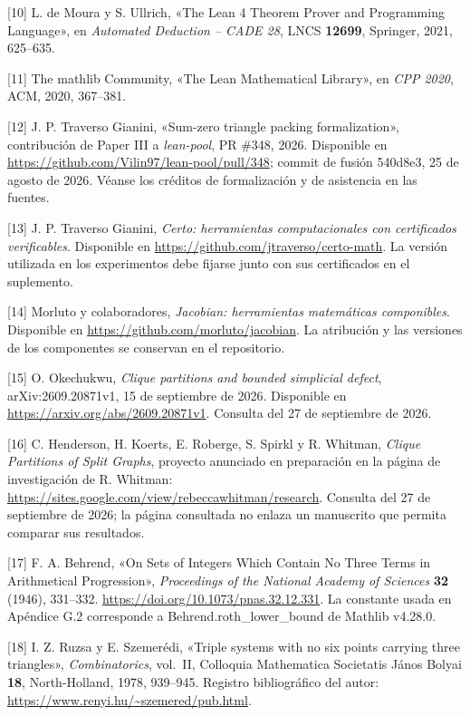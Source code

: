 \documentclass[spanish,11pt,a4paper]{article}
\begin{document}
\clearpage
{[}10{]} L. de Moura y S. Ullrich, «The Lean 4 Theorem Prover and Programming Language», en \emph{Automated Deduction -- CADE 28}, LNCS \textbf{12699}, Springer, 2021, 625--635.

{[}11{]} The mathlib Community, «The Lean Mathematical Library», en \emph{CPP 2020}, ACM, 2020, 367--381.

{[}12{]} J. P. Traverso Gianini, «Sum-zero triangle packing formalization», contribución de Paper III a \emph{lean-pool}, PR \#348, 2026. Disponible en \url{https://github.com/Vilin97/lean-pool/pull/348}; commit de fusión {\ttfamily\small 540d8e3}, 25 de agosto de 2026. Véanse los créditos de formalización y de asistencia en las fuentes.

{[}13{]} J. P. Traverso Gianini, \emph{Certo: herramientas computacionales con certificados verificables}. Disponible en \url{https://github.com/jtraverso/certo-math}. La versión utilizada en los experimentos debe fijarse junto con sus certificados en el suplemento.

{[}14{]} Morluto y colaboradores, \emph{Jacobian: herramientas matemáticas componibles}. Disponible en \url{https://github.com/morluto/jacobian}. La atribución y las versiones de los componentes se conservan en el repositorio.

{[}15{]} O. Okechukwu, \emph{Clique partitions and bounded simplicial defect}, arXiv:2609.20871v1, 15 de septiembre de 2026. Disponible en \url{https://arxiv.org/abs/2609.20871v1}. Consulta del 27 de septiembre de 2026.

{[}16{]} C. Henderson, H. Koerts, E. Roberge, S. Spirkl y R. Whitman, \emph{Clique Partitions of Split Graphs}, proyecto anunciado en preparación en la página de investigación de R. Whitman: \url{https://sites.google.com/view/rebeccawhitman/research}. Consulta del 27 de septiembre de 2026; la página consultada no enlaza un manuscrito que permita comparar sus resultados.

{[}17{]} F. A. Behrend, «On Sets of Integers Which Contain No Three Terms in Arithmetical Progression», \emph{Proceedings of the National Academy of Sciences} \textbf{32} (1946), 331--332. \url{https://doi.org/10.1073/pnas.32.12.331}. La constante usada en Apéndice G.2 corresponde a {\ttfamily\small Behrend.\discretionary{\hbox{\ensuremath{\hookrightarrow}}}{}{}roth\_\discretionary{\hbox{\ensuremath{\hookrightarrow}}}{}{}lower\_\discretionary{\hbox{\ensuremath{\hookrightarrow}}}{}{}bound} de Mathlib v4.28.0.

{[}18{]} I. Z. Ruzsa y E. Szemerédi, «Triple systems with no six points carrying three triangles», \emph{Combinatorics}, vol.~II, Colloquia Mathematica Societatis János Bolyai \textbf{18}, North-Holland, 1978, 939--945. Registro bibliográfico del autor: \url{https://www.renyi.hu/~szemered/pub.html}.
\end{document}
